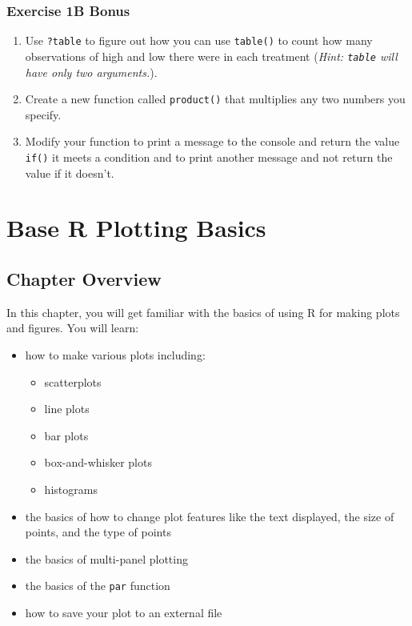 \documentclass[]{book}
\providecommand{\tightlist}{%
  \setlength{\itemsep}{0pt}\setlength{\parskip}{0pt}}
\theoremstyle{definition}
\theoremstyle{definition}
\theoremstyle{definition}
\theoremstyle{remark}
\begin{document}
\subsection*{Exercise 1B Bonus}\label{exercise-1b-bonus}

\begin{enumerate}
\def\labelenumi{\arabic{enumi}.}
\tightlist
\item
  Use \texttt{?table} to figure out how you can use \texttt{table()} to
  count how many observations of high and low there were in each
  treatment (\emph{Hint: \texttt{table} will have only two arguments.}).
\item
  Create a new function called \texttt{product()} that multiplies any
  two numbers you specify.
\item
  Modify your function to print a message to the console and return the
  value \texttt{if()} it meets a condition and to print another message
  and not return the value if it doesn't.
\end{enumerate}

\chapter{Base R Plotting Basics}\label{ch2}

\section*{Chapter Overview}\label{chapter-overview-1}

In this chapter, you will get familiar with the basics of using R for
making plots and figures. You will learn:

\begin{itemize}
\tightlist
\item
  how to make various plots including:

  \begin{itemize}
  \tightlist
  \item
    scatterplots
  \item
    line plots
  \item
    bar plots
  \item
    box-and-whisker plots
  \item
    histograms
  \end{itemize}
\item
  the basics of how to change plot features like the text displayed, the
  size of points, and the type of points
\item
  the basics of multi-panel plotting
\item
  the basics of the \texttt{par} function
\item
  how to save your plot to an external file
\end{itemize}
\end{document}
